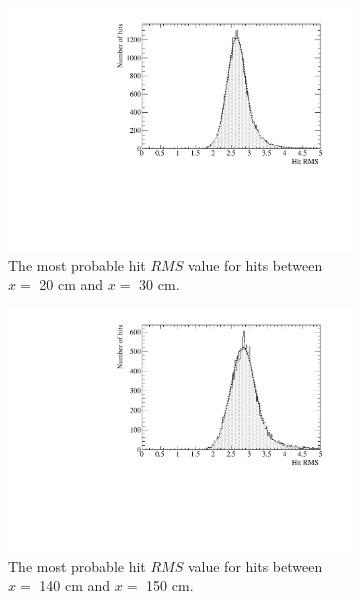 \begin{figure}
  \centering
  \begin{subfigure}{0.48\textwidth}
    \centering
    \includegraphics[width=\textwidth]{DataCan_0}
    \caption{The most probable hit $RMS$ value for hits between $x =$ 20 cm and $x =$ 30 cm.}
  \end{subfigure}%
  \hspace{0.03\textwidth}%
  \begin{subfigure}{0.48\textwidth}
    \centering
    \includegraphics[width=\textwidth]{DataCan_1}
    \caption{The most probable hit $RMS$ value for hits between $x =$ 140 cm and $x =$ 150 cm.}
  \end{subfigure}
  \begin{subfigure}{0.48\textwidth}
    \centering

\end{subfigure}
\end{figure}
